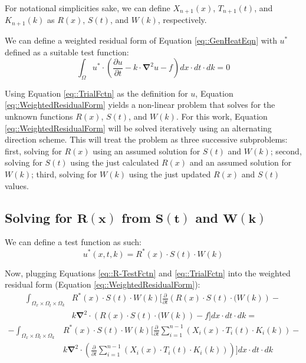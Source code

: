 \documentclass{article}
\def\ds{\displaystyle}
\def\pd{\partial}
\def\grad{\mathbf\nabla}
\begin{document}
For notational simplicities sake, we can define $X_{n+1}(x)$, $T_{n+1}(t)$, and $K_{n+1}(k)$ as $R(x)$, $S(t)$, and $W(k)$, respectively.  

We can define a weighted residual form of Equation \ref{eq::GenHeatEqn} with $u^*$ defined as a suitable test function:
\begin{equation}
\label{eq::WeightedResidualForm}
\ds\int_{\Omega} u^* \cdot\left(\frac{\pd u}{\pd t} -k\cdot\grad^2 u -f \right) dx \cdot dt \cdot dk = 0
\end{equation}

Using Equation \ref{eq::TrialFctn} as the definition for $u$, Equation \ref{eq::WeightedResidualForm} yields a non-linear problem that solves for the unknown functions $R(x)$, $S(t)$, and $W(k)$. For this work, Equation \ref{eq::WeightedResidualForm} will be solved iteratively using an alternating direction scheme. This will treat the problem as three successive subproblems: first, solving for $R(x)$ using an assumed solution for $S(t)$ and $W(k)$; second, solving for $S(t)$ using the just calculated $R(x)$ and an assumed solution for $W(k)$; third, solving for $W(k)$ using the just updated $R(x)$ and $S(t)$ values. 

\subsection{Solving for $\mathbf{R(x)}$ from $\mathbf{S(t)}$ and $\mathbf{W(k)}$}
We can define a test function as such:
\begin{equation}
\label{eq::R-TestFctn}
u^*(x,t,k) = R^*(x) \cdot S(t) \cdot W(k)
\end{equation}

Now, plugging Equations \ref{eq::R-TestFctn} and \ref{eq::TrialFctn} into the weighted residual form (Equation \ref{eq::WeightedResidualForm}):
\begin{align*}
\ds\int_{\Omega_x \times \Omega_t \times \Omega_k} & R^*(x) \cdot S(t) \cdot W(k) \bigg[ \frac{\pd}{\pd t} \left( R(x) \cdot S(t) \cdot (W(k) \right) - \\
&  k\grad^2 \cdot \left( R(x) \cdot S(t) \cdot (W(k) \right) -f \bigg] dx \cdot dt \cdot dk = 
\end{align*}
\begin{align}
\label{eq::R-1}
- \ds\int_{\Omega_x \times \Omega_t \times \Omega_k} & R^*(x) \cdot S(t) \cdot W(k) \Bigg[\frac{\pd}{\pd t} \ds\sum_{i=1}^{n-1} \left(X_i(x) \cdot T_i(t) \cdot K_i(k)\right) - \nonumber\\
&  k\grad^2 \cdot \left( \frac{\pd}{\pd t} \ds\sum_{i=1}^{n-1} \left(X_i(x) \cdot T_i(t) \cdot K_i(k)\right) \right)\Bigg] dx \cdot dt \cdot dk 
\end{align}
\end{document}
